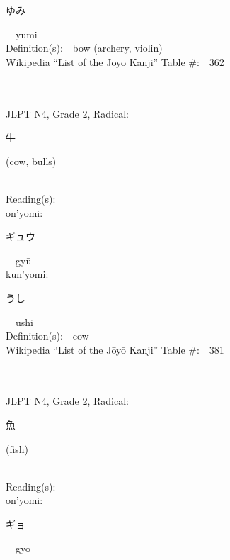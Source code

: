 \begin{multicols}{2}
{\hspace*{2em}}{\begin{CJK}{UTF8}{min} ゆみ \end{CJK}}\ \ yumi\ \ \\
Definition(s):\ \ bow (archery, violin) \\
Wikipedia ``List of the J\=oy\=o Kanji'' Table \#:\ \ 362 \\
\ \ \\
{\fontsize{34pt}{40pt}  }\ \ \\  %
{JLPT N4, Grade 2, Radical:\ \ {\begin{CJK}{UTF8}{min} 牛 \end{CJK}} (cow, bulls) } \\
Reading(s):\ \ \\
{\hspace*{1em}}on'yomi:\ \ \\
{\hspace*{2em}}{\begin{CJK}{UTF8}{min} ギュウ \end{CJK}}\ \ gy\=u\ \ \\
{\hspace*{1em}}kun'yomi:\ \ \\
{\hspace*{2em}}{\begin{CJK}{UTF8}{min} うし \end{CJK}}\ \ ushi\ \ \\
Definition(s):\ \ cow \\
Wikipedia ``List of the J\=oy\=o Kanji'' Table \#:\ \ 381 \\
\ \ \\
{\fontsize{34pt}{40pt}  }\ \ \\  %
{JLPT N4, Grade 2, Radical:\ \ {\begin{CJK}{UTF8}{min} 魚 \end{CJK}} (fish) } \\
Reading(s):\ \ \\
{\hspace*{1em}}on'yomi:\ \ \\
{\hspace*{2em}}{\begin{CJK}{UTF8}{min} ギョ \end{CJK}}\ \ gyo\ \ \\

\end{multicols}
